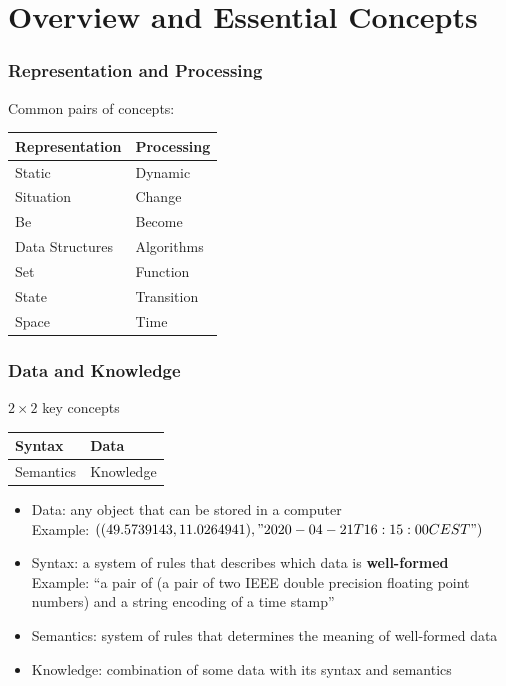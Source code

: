 \documentclass{beamer}
\begin{document}
\section{Overview and Essential Concepts}

\begin{frame}\frametitle{Representation and Processing}
Common pairs of concepts:
\begin{center}
\begin{tabular}{l|l}
Representation & Processing \\
\hline
Static & Dynamic \\
Situation & Change \\
Be & Become \\
Data Structures & Algorithms \\
Set & Function \\
State & Transition \\
Space & Time
\end{tabular}
\end{center}
\end{frame}

\begin{frame}\frametitle{Data and Knowledge}
$2\times 2$ key concepts
\begin{center}
\begin{tabular}{l|l}
Syntax & Data \\
\hline
Semantics & Knowledge
\end{tabular}
\end{center}

\begin{itemize}
\item Data: any object that can be stored in a computer\\
 Example: $((49.5739143, 11.0264941), "2020-04-21T16:15:00CEST")$
\item Syntax: a system of rules that describes which data is \textbf{well-formed}\\
 Example: ``a pair of (a pair of two IEEE double precision floating point numbers) and a string encoding of a time stamp''
\item Semantics: system of rules that determines the meaning of well-formed data
\item Knowledge: combination of some data with its syntax and semantics
\end{itemize}
\end{frame}
\end{document}
